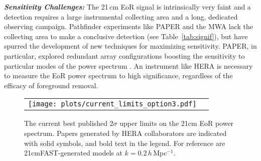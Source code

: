 \documentclass[preprint,11pt]{aastex}
\begin{document}

\noindent \textbf{\textit{Sensitivity Challenges:}} The
21\,cm EoR signal is intrinsically very faint and a detection requires  a
large instrumental collecting area and a long, dedicated observing campaign.
Pathfinder experiments like PAPER and the MWA lack the collecting
area to make a conclusive detection (see Table~\ref{tab:signif}), but have spurred the
development of new techniques for maximizing sensitivity.
PAPER, in particular, explored redundant array
configurations boosting the sensitivity to particular
modes of the power spectrum \citep{parsons_et_al2012a}.
An instrument like HERA is necessary to measure the EoR power
spectrum to high significance, regardless of the efficacy of foreground removal.

\begin{figure}[tbh!]
	\begin{tabular}{ll}
	\begin{minipage}{4.5in}
	\texttt{[image: plots/current\_limits\_option3.pdf]}
	\end{minipage} & 
	\begin{minipage}{1.75in}
	\caption{The current best published $2\sigma$ upper limits on the 21cm EoR power spectrum. Papers generated by HERA collaborators are indicated with solid symbols, and bold text in the legend. For reference are 21cmFAST-generated models at $k=0.2$\,$h$\,Mpc$^{-1}$.}
	\label{fig:CurrentLimits}
	\end{minipage}
	\end{tabular}
	\vspace{-11pt}
\end{figure}
\end{document}
